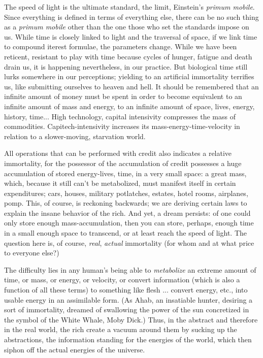 \documentclass[11pt,twoside,draft]{memoir}
\begin{document}
The speed of light is the ultimate standard,
the limit, Einstein's \emph{primum mobile}. Since
everything is defined in terms of everything
else, there can be no such thing as a \emph{primum
mobile} other than the one those who set the
standards impose on us. While time is
closely linked to light and the traversal of
space, if we link time to compound iterest
formulae, the parameters change. While we
have been reticent, resistant to play with
time because cycles of hunger, fatigue and
death drain us, it is happening nevertheless,
in our practice. But biological time still lurks
somewhere in our perceptions; yielding to
an artificial immortality terrifies us,
like submitting ourselves to heaven and hell.
It should be remembered that an infinite
amount of money must be spent in order to
become equivalent to an infinite amount of
mass and energy, to an infinite amount of
space, lives, energy, history, time... High
technology, capital intensivity compresses
the mass of commodities. Capitech-intensivity increases its mass-energy-time-velocity
in relation to a slower-moving, starvation world.

All operations that can be performed with
credit also indicates a relative immortality,
for the possessor of the accumulation of
credit possesses a huge accumulation of
stored energy-lives, time, in a very small
space: a great mass, which, because it still
can't be metabolized, must manifest itself in
certain expenditures; cars, houses, military
potlatches, estates, hotel rooms, airplanes,
pomp. This, of course, is reckoning backwards; we are deriving certain laws to explain the insane behavior of the rich. And
yet, a dream persists: of one could only store
enough mass-accumulation, then you can
store, perhaps, enough time in a small enough
space to transcend, or at least reach the
speed of light. The question here is, of
course, \emph{real}, \emph{actual} immortality (for whom
and at what price to everyone else?)

The difficulty lies in any human's being able to \emph{metabolize} an extreme amount of
time, or mass, or energy, or velocity, or convert information (which is also a function of all these terms) to something like flesh ...
convert energy, etc., into usable
energy in an assimilable form. (As Ahab, an
insatiable hunter, desiring a sort of immortality, dreamed of swallowing the power of
the sun concretized in the symbol of the
White Whale, Moby Dick.) Thus, in the abstract and therefore in the real world, the
rich create a vacuum around them by sucking up the abstractions, the information
standing for the energies of the world, which
then siphon off the actual energies of the
universe.
\end{document}
